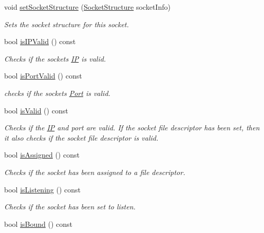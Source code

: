 \begin{DoxyCompactItemize}
void \hyperlink{class_communication_1_1base_socket_a8bbe17d829e80da212b15ec271a6c7b0}{set\+Socket\+Structure} (\hyperlink{class_communication_1_1_socket_structure}{Socket\+Structure} socket\+Info)
\begin{DoxyCompactList}\small\item\em Sets the socket structure for this socket. \end{DoxyCompactList}\item 
bool \hyperlink{class_communication_1_1base_socket_a4c6da12f4f5202671c02dc83f22831a7}{is\+I\+P\+Valid} () const 
\begin{DoxyCompactList}\small\item\em Checks if the sockets \hyperlink{class_communication_1_1_i_p}{I\+P} is valid. \end{DoxyCompactList}\item 
bool \hyperlink{class_communication_1_1base_socket_a70e5ae4df0f7736b9e528ad8ff22bb7a}{is\+Port\+Valid} () const 
\begin{DoxyCompactList}\small\item\em checks if the sockets \hyperlink{class_communication_1_1_port}{Port} is valid. \end{DoxyCompactList}\item 
bool \hyperlink{class_communication_1_1base_socket_ae17db190efde85e725b68e17053a7b2e}{is\+Valid} () const 
\begin{DoxyCompactList}\small\item\em Checks if the \hyperlink{class_communication_1_1_i_p}{I\+P} and port are valid. If the socket file descriptor has been set, then it also checks if the socket file descriptor is valid. \end{DoxyCompactList}\item 
bool \hyperlink{class_communication_1_1base_socket_ab1a93d814a26672e39b333aaf5d41051}{is\+Assigned} () const 
\begin{DoxyCompactList}\small\item\em Checks if the socket has been assigned to a file descriptor. \end{DoxyCompactList}\item 
bool \hyperlink{class_communication_1_1base_socket_aaa5cf7099830637f0029fcac12e35d8d}{is\+Listening} () const 
\begin{DoxyCompactList}\small\item\em Checks if the socket has been set to listen. \end{DoxyCompactList}\item 
bool \hyperlink{class_communication_1_1base_socket_a376b19659ad45dd34109dc81d4ddb840}{is\+Bound} () const 

\end{DoxyCompactItemize}
